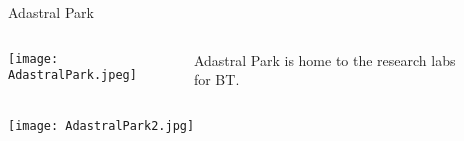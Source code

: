 \documentclass[final]{beamer}
\theoremstyle{plain}
\theoremstyle{definition}
\theoremstyle{remark}
\newlength{\sepwid}
\newlength{\onecolwid}
\newlength{\twocolwid}
\begin{document}
\begin{frame}[t]
\begin{columns}[t]
\begin{column}{\onecolwid}
    \begin{mdframed}[backgroundcolor=white, userdefinedwidth=0.999999\linewidth]
    \centering
    \center
    \end{mdframed}
    \vspace{1.5cm}
\begin{block}{Adastral Park}
\begin{columns}
\begin{column}{0.5\linewidth}
\texttt{[image: AdastralPark.jpeg]} \\ \end{column}
\begin{column}{0.25\linewidth}
Adastral Park is home to the research labs for BT.
\end{column}
\end{columns}
 \vspace{1cm}
\texttt{[image: AdastralPark2.jpg]}
\end{block}


\end{column} %

\begin{column}{\sepwid}\end{column} %

\begin{column}{\twocolwid} %

\begin{mdframed}[backgroundcolor=white, userdefinedwidth=0.999999\linewidth]
    \centering
    \center
  

\end{mdframed}
\end{column}
\end{columns}
\end{frame}
\end{document}
